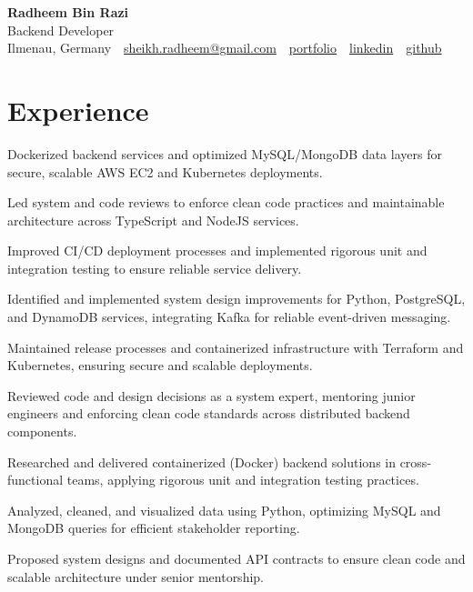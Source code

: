 \documentclass[11pt,a4paper]{resume}
\makeatletter
\newcommand{\Portfolio}{https://radheem.github.io/my-cv}
\newcommand{\PortfolioText}{portfolio}
\newcommand{\GitHub}{https://github.com/radheem}
\newcommand{\LinkedIn}{https://www.linkedin.com/in/radheem-razi}
\newcommand{\Email}{sheikh.radheem@gmail.com}
\makeatother
\begin{document}
\begin{center}
  {\huge\bfseries Radheem Bin Razi}\\[3pt]
  {\large Backend Developer}\\[6pt]
  \small
  Ilmenau, Germany \,\textbar\,
  \href{mailto:\Email}{\Email} \,\textbar\,
  \href{\Portfolio}{\PortfolioText} \,\textbar\,
  \href{\LinkedIn}{linkedin} \,\textbar\,
  \href{\GitHub}{github}
\end{center}
\vspace{2pt}

\section{Experience}

\bullets
  \item Dockerized backend services and optimized MySQL/MongoDB data layers for secure, scalable AWS EC2 and Kubernetes deployments.
  \item Led system and code reviews to enforce clean code practices and maintainable architecture across TypeScript and NodeJS services.
  \item Improved CI/CD deployment processes and implemented rigorous unit and integration testing to ensure reliable service delivery.
\bulletsend
\vspace{3pt}
\bullets
  \item Identified and implemented system design improvements for Python, PostgreSQL, and DynamoDB services, integrating Kafka for reliable event-driven messaging.
  \item Maintained release processes and containerized infrastructure with Terraform and Kubernetes, ensuring secure and scalable deployments.
  \item Reviewed code and design decisions as a system expert, mentoring junior engineers and enforcing clean code standards across distributed backend components.
\bulletsend
\vspace{3pt}
\bullets
  \item Researched and delivered containerized (Docker) backend solutions in cross-functional teams, applying rigorous unit and integration testing practices.
  \item Analyzed, cleaned, and visualized data using Python, optimizing MySQL and MongoDB queries for efficient stakeholder reporting.
  \item Proposed system designs and documented API contracts to ensure clean code and scalable architecture under senior mentorship.
\bulletsend
\vspace{3pt}
\end{document}
